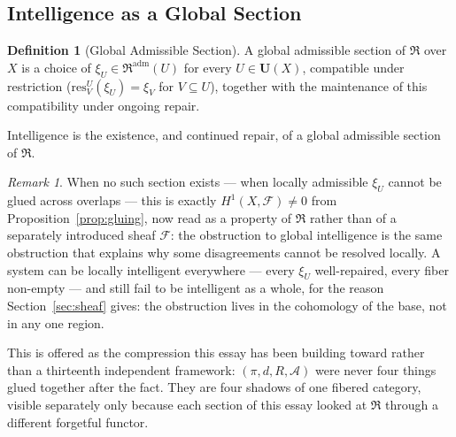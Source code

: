 \documentclass[11pt]{article}
\theoremstyle{plain}
\theoremstyle{definition}
\newtheorem{definition}[theorem]{Definition}
\theoremstyle{remark}
\newtheorem{remark}[theorem]{Remark}
\begin{document}
\subsection{Intelligence as a Global Section}

\begin{definition}[Global Admissible Section]
A global admissible section of $\mathfrak{R}$ over $X$ is a choice of $\xi_U \in \mathfrak{R}^{\mathrm{adm}}(U)$ for every $U \in \mathbf{U}(X)$, compatible under restriction ($\mathrm{res}^U_V(\xi_U) = \xi_V$ for $V \subseteq U$), together with the maintenance of this compatibility under ongoing repair.
\end{definition}

\begin{tcolorbox}[title=The Unifying Principle]
Intelligence is the existence, and continued repair, of a global admissible section of $\mathfrak{R}$.
\end{tcolorbox}

\begin{remark}
When no such section exists --- when locally admissible $\xi_U$ cannot be glued across overlaps --- this is exactly $H^1(X,\mathscr{F}) \ne 0$ from Proposition~\ref{prop:gluing}, now read as a property of $\mathfrak{R}$ rather than of a separately introduced sheaf $\mathscr{F}$: the obstruction to global intelligence is the same obstruction that explains why some disagreements cannot be resolved locally. A system can be locally intelligent everywhere --- every $\xi_U$ well-repaired, every fiber non-empty --- and still fail to be intelligent as a whole, for the reason Section~\ref{sec:sheaf} gives: the obstruction lives in the cohomology of the base, not in any one region.
\end{remark}

This is offered as the compression this essay has been building toward rather than a thirteenth independent framework: $(\pi,d,R,\mathcal{A})$ were never four things glued together after the fact. They are four shadows of one fibered category, visible separately only because each section of this essay looked at $\mathfrak{R}$ through a different forgetful functor.
\end{document}
